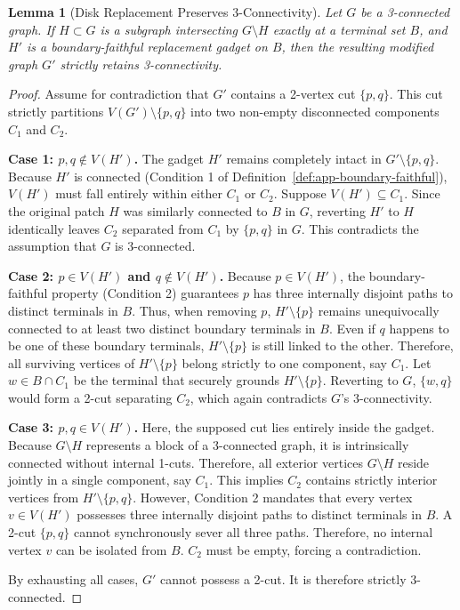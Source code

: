 \documentclass[12pt]{article}
\newtheorem{lemma}[theorem]{Lemma}
\begin{document}
\begin{lemma}[Disk Replacement Preserves 3-Connectivity]
\label{lem:app-disk-replacement}
Let $G$ be a 3-connected graph. If $H \subset G$ is a subgraph intersecting $G \setminus H$ exactly at a terminal set $B$, and $H'$ is a boundary-faithful replacement gadget on $B$, then the resulting modified graph $G'$ strictly retains 3-connectivity.
\end{lemma}
\begin{proof}
Assume for contradiction that $G'$ contains a 2-vertex cut $\{p, q\}$. This cut strictly partitions $V(G') \setminus \{p, q\}$ into two non-empty disconnected components $C_1$ and $C_2$.

\textbf{Case 1: $p, q \notin V(H')$.}
The gadget $H'$ remains completely intact in $G' \setminus \{p, q\}$. Because $H'$ is connected (Condition 1 of Definition~\ref{def:app-boundary-faithful}), $V(H')$ must fall entirely within either $C_1$ or $C_2$. Suppose $V(H') \subseteq C_1$. Since the original patch $H$ was similarly connected to $B$ in $G$, reverting $H'$ to $H$ identically leaves $C_2$ separated from $C_1$ by $\{p, q\}$ in $G$. This contradicts the assumption that $G$ is 3-connected.

\textbf{Case 2: $p \in V(H')$ and $q \notin V(H')$.}
Because $p \in V(H')$, the boundary-faithful property (Condition 2) guarantees $p$ has three internally disjoint paths to distinct terminals in $B$. Thus, when removing $p$, $H' \setminus \{p\}$ remains unequivocally connected to at least two distinct boundary terminals in $B$. Even if $q$ happens to be one of these boundary terminals, $H' \setminus \{p\}$ is still linked to the other. Therefore, all surviving vertices of $H' \setminus \{p\}$ belong strictly to one component, say $C_1$. Let $w \in B \cap C_1$ be the terminal that securely grounds $H' \setminus \{p\}$. Reverting to $G$, $\{w, q\}$ would form a 2-cut separating $C_2$, which again contradicts $G$'s 3-connectivity.

\textbf{Case 3: $p, q \in V(H')$.}
Here, the supposed cut lies entirely inside the gadget. Because $G \setminus H$ represents a block of a 3-connected graph, it is intrinsically connected without internal 1-cuts. Therefore, all exterior vertices $G \setminus H$ reside jointly in a single component, say $C_1$. This implies $C_2$ contains strictly interior vertices from $H' \setminus \{p, q\}$. However, Condition 2 mandates that every vertex $v \in V(H')$ possesses three internally disjoint paths to distinct terminals in $B$. A 2-cut $\{p, q\}$ cannot synchronously sever all three paths. Therefore, no internal vertex $v$ can be isolated from $B$. $C_2$ must be empty, forcing a contradiction.

By exhausting all cases, $G'$ cannot possess a 2-cut. It is therefore strictly 3-connected.
\end{proof}
\end{document}
